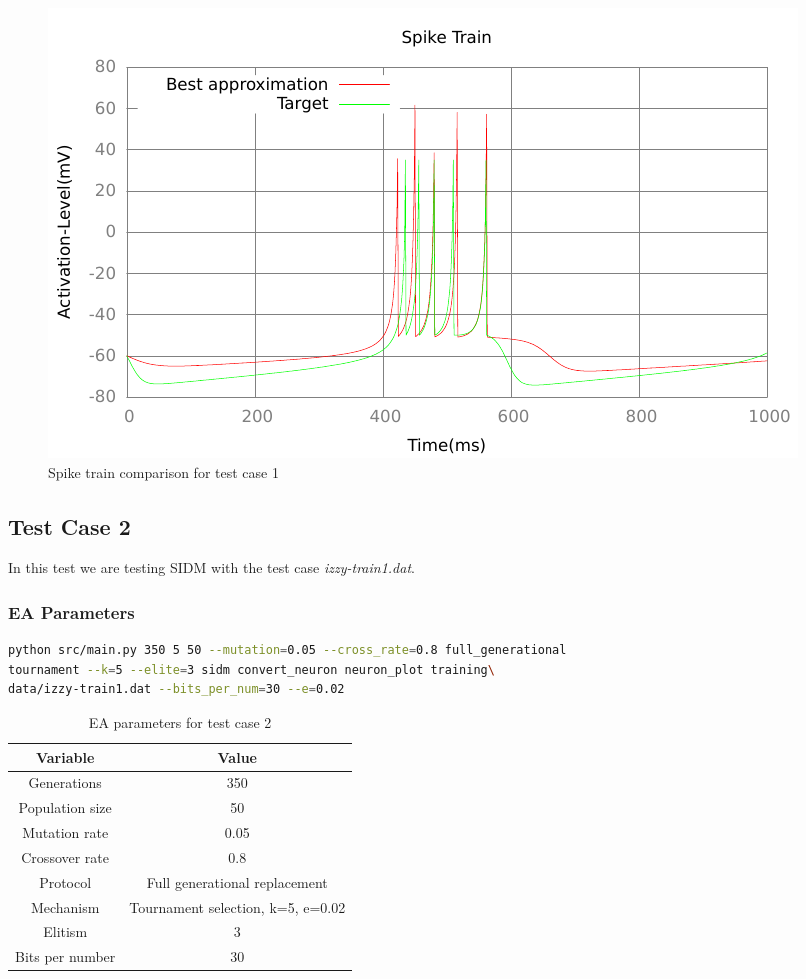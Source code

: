 \begin{figure}[h]
	\centering
	\includegraphics{../output/stdm_izzy_1_spike.pdf}
	\caption{Spike train comparison for test case 1}
	\label{fig:spike-test-case-1}
\end{figure}

\subsection{Test Case 2}\label{sec:test-case-2}
In this test we are testing SIDM with the test case
\textit{izzy-train1.dat}.
\subsubsection{EA Parameters}\label{sec:test-case-2-parameters}
\begin{lstlisting}[frame=single, language=bash, caption=Command-line to
replicate the results]
python src/main.py 350 5 50 --mutation=0.05 --cross_rate=0.8 full_generational
tournament --k=5 --elite=3 sidm convert_neuron neuron_plot training\
data/izzy-train1.dat --bits_per_num=30 --e=0.02
\end{lstlisting}
\begin{table}
	\begin{tabular}{c c}
		Variable & Value \\
		\hline
		Generations & 350 \\
		\hline
		Population size & 50 \\
		\hline
		Mutation rate & 0.05 \\
		\hline
		Crossover rate & 0.8 \\
		\hline
		Protocol & Full generational replacement \\
		\hline
		Mechanism & Tournament selection, k=5, e=0.02 \\
		\hline
		Elitism & 3 \\
		\hline
		Bits per number & 30 \\
	\end{tabular}
	\caption{EA parameters for test case 2}
\end{table}
